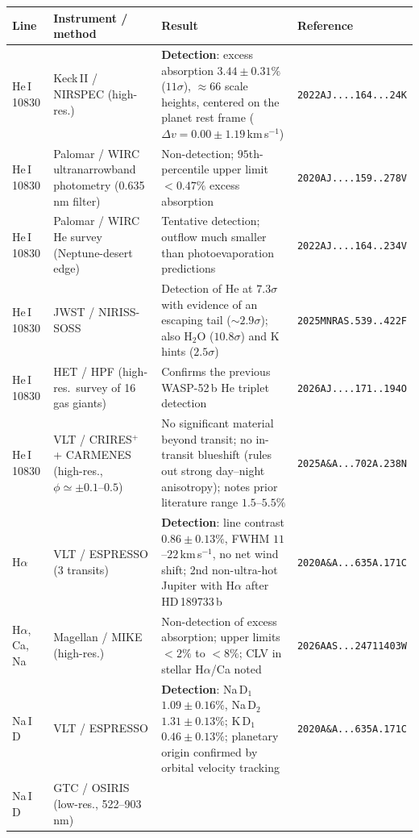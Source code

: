 \begin{longtable}{@{}p{2.0cm} p{2.8cm} p{5.3cm} p{2.9cm}@{}}
\toprule
Line & Instrument / method & Result & Reference \\
\midrule
\endhead
He\,I 10830 & Keck\,II / NIRSPEC (high-res.) &
\textbf{Detection}: excess absorption $3.44\pm0.31\%$ ($11\sigma$), $\approx66$ scale
heights, centered on the planet rest frame ($\Delta v=0.00\pm1.19$\,km\,s$^{-1}$) &
{\footnotesize\texttt{2022AJ....164...24K}} \\
He\,I 10830 & Palomar / WIRC ultranarrowband photometry (0.635\,nm filter) &
Non-detection; $95$th-percentile upper limit $<0.47\%$ excess absorption &
{\footnotesize\texttt{2020AJ....159..278V}} \\
He\,I 10830 & Palomar / WIRC He survey (Neptune-desert edge) &
Tentative detection; outflow much smaller than photoevaporation predictions &
{\footnotesize\texttt{2022AJ....164..234V}} \\
He\,I 10830 & JWST / NIRISS-SOSS &
Detection of He at $7.3\sigma$ with evidence of an escaping tail ($\sim2.9\sigma$);
also H$_2$O ($10.8\sigma$) and K hints ($2.5\sigma$) &
{\footnotesize\texttt{2025MNRAS.539..422F}} \\
He\,I 10830 & HET / HPF (high-res.\ survey of 16 gas giants) &
Confirms the previous WASP-52\,b He triplet detection &
{\footnotesize\texttt{2026AJ....171..194O}} \\
He\,I 10830 & VLT / CRIRES$^+$ + CARMENES (high-res., $\phi\simeq\pm0.1$--$0.5$) &
No significant material beyond transit; no in-transit blueshift (rules out strong
day--night anisotropy); notes prior literature range $1.5$--$5.5\%$ &
{\footnotesize\texttt{2025A\&A...702A.238N}} \\
H$\alpha$ & VLT / ESPRESSO (3 transits) &
\textbf{Detection}: line contrast $0.86\pm0.13\%$, FWHM $11$--$22$\,km\,s$^{-1}$, no net
wind shift; 2nd non-ultra-hot Jupiter with H$\alpha$ after HD\,189733\,b &
{\footnotesize\texttt{2020A\&A...635A.171C}} \\
H$\alpha$, Ca, Na & Magellan / MIKE (high-res.) &
Non-detection of excess absorption; upper limits $<2\%$ to $<8\%$; CLV in stellar
H$\alpha$/Ca noted &
{\footnotesize\texttt{2026AAS...24711403W}} \\
Na\,I\,D & VLT / ESPRESSO &
\textbf{Detection}: Na\,D$_1$ $1.09\pm0.16\%$, Na\,D$_2$ $1.31\pm0.13\%$; K\,D$_1$
$0.46\pm0.13\%$; planetary origin confirmed by orbital velocity tracking &
{\footnotesize\texttt{2020A\&A...635A.171C}} \\
Na\,I\,D & GTC / OSIRIS (low-res., 522--903\,nm) &

\end{longtable}
